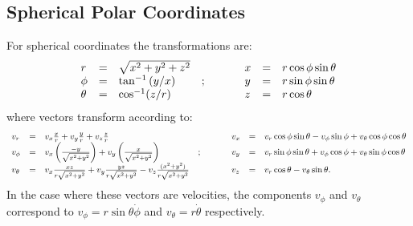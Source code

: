 \documentclass[a4paper,11pt]{article}
\begin{document}
\subsection{ Spherical Polar Coordinates}
For spherical coordinates the transformations are:
\begin{displaymath}
\begin{array}{lclp{1cm}lcl}
r & = & \sqrt{x^2 + y^2 + z^{2}}    & & x & = & r\cos\phi\sin\theta\\
\phi & = & \tan^{-1}{(y/x)}              &; & y & = & r\sin\phi\sin\theta \\
\theta & = & \cos^{-1}(z/r)             & & z & = & r\cos\theta \\
\end{array}
\end{displaymath}
where vectors transform according to:
\begin{displaymath}
\begin{array}{lclp{1cm}lcl}
v_r      & = & v_x \frac{x}{r} + v_y \frac{y}{r} + v_{z}\frac{z}{r}  & & v_x & = & v_r \cos\phi\sin\theta- v_\phi \sin\phi + v_\theta \cos\phi\cos\theta \\
v_\phi & = & v_x \left(\frac{-y}{\sqrt{x^2 + y^{2}}}\right) + v_y \left(\frac{x}{\sqrt{x^2 + y^{2}}}\right) &; &v_y & = & v_r \sin\phi\sin\theta + v_\phi \cos\phi + v_{\theta} \sin\phi\cos\theta \\
v_\theta & = & v_{x}\frac{xz}{r \sqrt{x^{2} + y^{2}}} + v_{y}\frac{yz}{r \sqrt{x^{2} + y^{2}}} - v_{z}\frac{(x^{2} + y^{2})}{r\sqrt{x^{2} + y^{2}}}  & & v_z & = & v_r \cos\theta - v_\theta \sin\theta. \\
\end{array}
\end{displaymath}
In the case where these vectors are velocities, the components $v_{\phi}$ and $v_{\theta}$ correspond to $v_{\phi} = r\sin{\theta}\dot{\phi}$ and $v_{\theta} = r\dot{\theta}$ respectively.
\end{document}
